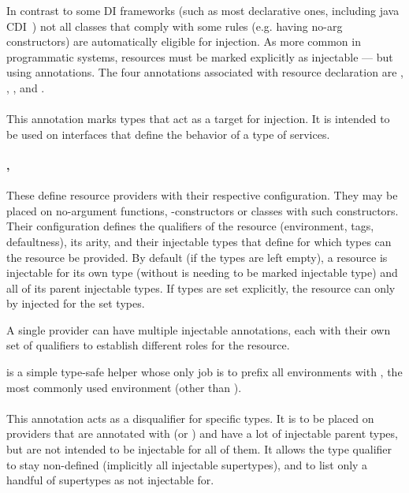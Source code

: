 	In contrast to some DI frameworks (such as most declarative ones, including java CDI~\cite{CdiInjectable}) not all classes that comply with some rules (e.g. having no-arg constructors) are automatically eligible for injection. As more common in programmatic systems, resources must be marked explicitly as injectable --- but using annotations.
	The four annotations associated with resource declaration are , , , and .

		\paragraph{} This annotation marks types that act as a target for injection. It is intended to be used on interfaces that define the behavior of a type of services.
		
		\paragraph{, } These define resource providers with their respective configuration. They may be placed on no-argument functions, -constructors or classes with such constructors. Their configuration defines the qualifiers of the resource (environment, tags, defaultness), its arity, and their injectable types that define for which types can the resource be provided. By default (if the types are left empty), a resource is injectable for its own type (without is needing to be marked injectable type) and all of its parent injectable types. If types are set explicitly, the resource can only by injected for the set types.
		
		A single provider can have multiple injectable annotations, each with their own set of qualifiers to establish different roles for the resource.
		
		 is a simple type-safe helper whose only job is to prefix all environments with , the most commonly used environment (other than ).

		\paragraph{} This annotation	acts as a disqualifier for specific types. It is to be placed on providers that are annotated with  (or ) and have a lot of injectable parent types, but are not intended to be injectable for all of them. It allows the type qualifier to stay non-defined (implicitly all injectable supertypes), and to list only a handful of supertypes as not injectable for.

